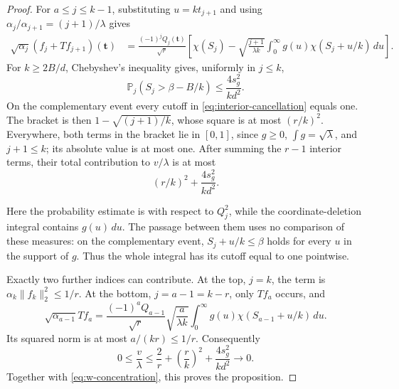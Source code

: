 \begin{proof}
For $a\le j\le k-1$, substituting $u=kt_{j+1}$ and using
$\alpha_j/\alpha_{j+1}=(j+1)/\lambda$ gives
\begin{align}
 \sqrt{\alpha_j}(f_j+Tf_{j+1})(\mathbf t)
 &=\frac{(-1)^jQ_j(\mathbf t)}{\sqrt r}
       \left[\chi(S_j)-\sqrt{\frac{j+1}{\lambda k}}
                  \int_0^\infty g(u)\chi(S_j+u/k)\,du\right].
 \label{eq:interior-cancellation}
\end{align}
For $k\ge2B/d$, Chebyshev's inequality gives, uniformly in $j\le k$,
\[
 \mathbb P_j(S_j>\beta-B/k)\le\frac{4s_g^2}{kd^2}.
\]
On the complementary event every cutoff in
\eqref{eq:interior-cancellation} equals one.  The bracket is then
$1-\sqrt{(j+1)/k}$, whose square is at most $(r/k)^2$.  Everywhere,
both terms in the bracket lie in $[0,1]$, since $g\ge0$,
$\int g=\sqrt\lambda$, and $j+1\le k$; its absolute value is at most
one.  After summing the $r-1$ interior terms, their total contribution
to $v/\lambda$ is at most
\[
 (r/k)^2+\frac{4s_g^2}{kd^2}.
\]

Here the probability estimate is with respect to $Q_j^2$, while the
coordinate-deletion integral contains $g(u)\,du$. The passage between
them uses no comparison of these measures: on the complementary event,
$S_j+u/k\le\beta$ holds for every $u$ in the support of $g$.
Thus the whole integral has its cutoff equal to one pointwise.

Exactly two further indices can contribute.  At the top, $j=k$, the
term is $\alpha_k\|f_k\|_2^2\le1/r$.  At the bottom,
$j=a-1=k-r$, only $Tf_a$ occurs, and
\[
 \sqrt{\alpha_{a-1}}Tf_a
 =\frac{(-1)^aQ_{a-1}}{\sqrt r}
      \sqrt{\frac a{\lambda k}}
      \int_0^\infty g(u)\chi(S_{a-1}+u/k)\,du.
\]
Its squared norm is at most $a/(kr)\le1/r$.  Consequently
\begin{equation}
 0\le\frac v\lambda
 \le\frac2r+\left(\frac rk\right)^2+\frac{4s_g^2}{kd^2}
 \longrightarrow0.
 \label{eq:v-cancellation-bound}
\end{equation}
Together with \eqref{eq:w-concentration}, this proves the proposition.
\end{proof}

